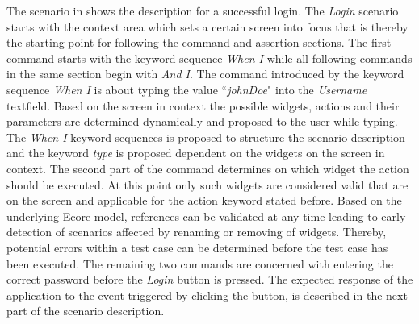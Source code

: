 \documentclass{sig-alternate-05-2015}
\begin{document}
The scenario in  shows the description for a successful login.
The \textit{Login} scenario starts with the context area which sets a certain screen into focus that is thereby the starting point for following the command and assertion sections.
The first command starts with the keyword sequence \textit{When I} while all following commands in the same section begin with \textit{And I}.
The command introduced by the keyword sequence \textit{When I} is about typing the value ``\textit{johnDoe}" into the \textit{Username} textfield. 
Based on the screen in context the possible widgets, actions and their parameters are determined dynamically and proposed to the user while typing.
The \textit{When I} keyword sequences is proposed to structure the scenario description and the keyword \textit{type} is proposed dependent on the widgets on the screen in context.
The second part of the command determines on which widget the action should be executed.
At this point only such widgets are considered valid that are on the screen and applicable for the action keyword stated before.
Based on the underlying Ecore model, references can be validated at any time leading to early detection of scenarios affected by renaming or removing of widgets.
Thereby, potential errors within a test case can be determined before the test case has been executed.
The remaining two commands are concerned with entering the correct password before the \textit{Login} button is pressed.
The expected response of the application to the event triggered by clicking the button, is described in the next part of the scenario description.
\end{document}
